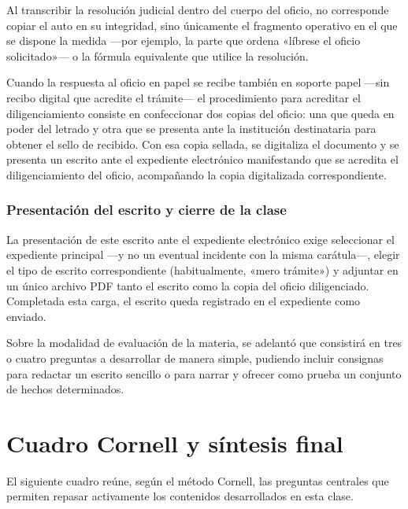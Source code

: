 \documentclass[12pt,oneside]{book}
\begin{document}
\begin{important}
Al transcribir la resolución judicial dentro del cuerpo del oficio, no corresponde copiar el auto en su integridad, sino únicamente el fragmento operativo en el que se dispone la medida —por ejemplo, la parte que ordena «líbrese el oficio solicitado»— o la fórmula equivalente que utilice la resolución.
\end{important}

Cuando la respuesta al oficio en papel se recibe también en soporte papel —sin recibo digital que acredite el trámite— el procedimiento para acreditar el diligenciamiento consiste en confeccionar dos copias del oficio: una que queda en poder del letrado y otra que se presenta ante la institución destinataria para obtener el sello de recibido. Con esa copia sellada, se digitaliza el documento y se presenta un escrito ante el expediente electrónico manifestando que se acredita el diligenciamiento del oficio, acompañando la copia digitalizada correspondiente.

\subsection{Presentación del escrito y cierre de la clase}

La presentación de este escrito ante el expediente electrónico exige seleccionar el expediente principal —y no un eventual incidente con la misma carátula—, elegir el tipo de escrito correspondiente (habitualmente, «mero trámite») y adjuntar en un único archivo PDF tanto el escrito como la copia del oficio diligenciado. Completada esta carga, el escrito queda registrado en el expediente como enviado.

\begin{note}
Sobre la modalidad de evaluación de la materia, se adelantó que consistirá en tres o cuatro preguntas a desarrollar de manera simple, pudiendo incluir consignas para redactar un escrito sencillo o para narrar y ofrecer como prueba un conjunto de hechos determinados.
\end{note}

\chapter{Cuadro Cornell y síntesis final}

El siguiente cuadro reúne, según el método Cornell, las preguntas centrales que permiten repasar activamente los contenidos desarrollados en esta clase.
\end{document}
